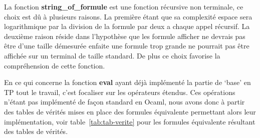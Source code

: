 \documentclass[12pt]{article}
\begin{document}
    \vphantom{}

    La fonction \textbf{string\_of\_formule} est une fonction récursive non 
    terminale, ce choix est dû à plusieurs raisons. La première étant que sa 
    complexité espace sera logarithmique par la division de la formule par deux
    a chaque appel récursif. La deuxième raison réside dans l'hypothèse que les
    formule afficher ne devrais pas être d'une taille démesurée enfaite une 
    formule trop grande ne pourrait pas être affichée sur un terminal de taille
    standard. De plus ce choix favorise la compréhension de cette fonction.

    \vphantom{}

    En ce qui concerne la fonction \textbf{eval} ayant déjà implémenté la
    partie de `base' en TP tout le travail, c'est focaliser sur les opérateurs
    étendus. Ces opérations n'étant pas implémenté de façon standard en Ocaml,
    nous avons donc à partir des tables de vérités mises en place des formules 
    équivalente permettant alors leur implémentation, voir 
    table~\ref{tab:tab-verite} pour les formules équivalente résultant des 
    tables de vérités.  
\end{document}
